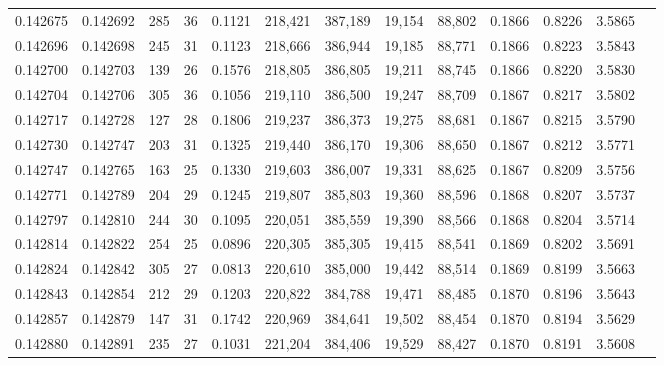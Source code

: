 \begin{tabular}{rrrrrrrrrrrrr}
0.142675 & 0.142692 &   285 &  36 &                                     0.1121 & 218,421 & 387,189 &  19,154 &  88,802 & 0.1866 & 0.8226 & 3.5865 \\
0.142696 & 0.142698 &   245 &  31 &                                     0.1123 & 218,666 & 386,944 &  19,185 &  88,771 & 0.1866 & 0.8223 & 3.5843 \\
0.142700 & 0.142703 &   139 &  26 &                                     0.1576 & 218,805 & 386,805 &  19,211 &  88,745 & 0.1866 & 0.8220 & 3.5830 \\
0.142704 & 0.142706 &   305 &  36 &                                     0.1056 & 219,110 & 386,500 &  19,247 &  88,709 & 0.1867 & 0.8217 & 3.5802 \\
0.142717 & 0.142728 &   127 &  28 &                                     0.1806 & 219,237 & 386,373 &  19,275 &  88,681 & 0.1867 & 0.8215 & 3.5790 \\
0.142730 & 0.142747 &   203 &  31 &                                     0.1325 & 219,440 & 386,170 &  19,306 &  88,650 & 0.1867 & 0.8212 & 3.5771 \\
0.142747 & 0.142765 &   163 &  25 &                                     0.1330 & 219,603 & 386,007 &  19,331 &  88,625 & 0.1867 & 0.8209 & 3.5756 \\
0.142771 & 0.142789 &   204 &  29 &                                     0.1245 & 219,807 & 385,803 &  19,360 &  88,596 & 0.1868 & 0.8207 & 3.5737 \\
0.142797 & 0.142810 &   244 &  30 &                                     0.1095 & 220,051 & 385,559 &  19,390 &  88,566 & 0.1868 & 0.8204 & 3.5714 \\
0.142814 & 0.142822 &   254 &  25 &                                     0.0896 & 220,305 & 385,305 &  19,415 &  88,541 & 0.1869 & 0.8202 & 3.5691 \\
0.142824 & 0.142842 &   305 &  27 &                                     0.0813 & 220,610 & 385,000 &  19,442 &  88,514 & 0.1869 & 0.8199 & 3.5663 \\
0.142843 & 0.142854 &   212 &  29 &                                     0.1203 & 220,822 & 384,788 &  19,471 &  88,485 & 0.1870 & 0.8196 & 3.5643 \\
0.142857 & 0.142879 &   147 &  31 &                                     0.1742 & 220,969 & 384,641 &  19,502 &  88,454 & 0.1870 & 0.8194 & 3.5629 \\
0.142880 & 0.142891 &   235 &  27 &                                     0.1031 & 221,204 & 384,406 &  19,529 &  88,427 & 0.1870 & 0.8191 & 3.5608 \\

\end{tabular}
